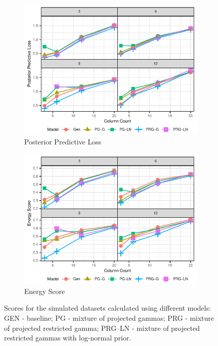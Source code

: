 \begin{figure}[ht]
\begin{center}
  \begin{subfigure}[b]{0.48\textwidth}
    \includegraphics[width=\textwidth]{./images/simulation_ppl}
    \caption{Posterior Predictive Loss\label{fig:simppl}}
  \end{subfigure}
  \begin{subfigure}[b]{0.48\textwidth}
    \includegraphics[width=\textwidth]{./images/simulation_es}
    \caption{Energy Score\label{fig:simes}}
  \end{subfigure}
  \caption{Scores for the simulated datasets calculated using different models:
  GEN - baseline; PG - mixture of projected gammas; PRG - mixture of projected restricted gamma; PRG--LN - mixture of projected restricted gammas with log-normal prior.}
\end{center}
\end{figure}

